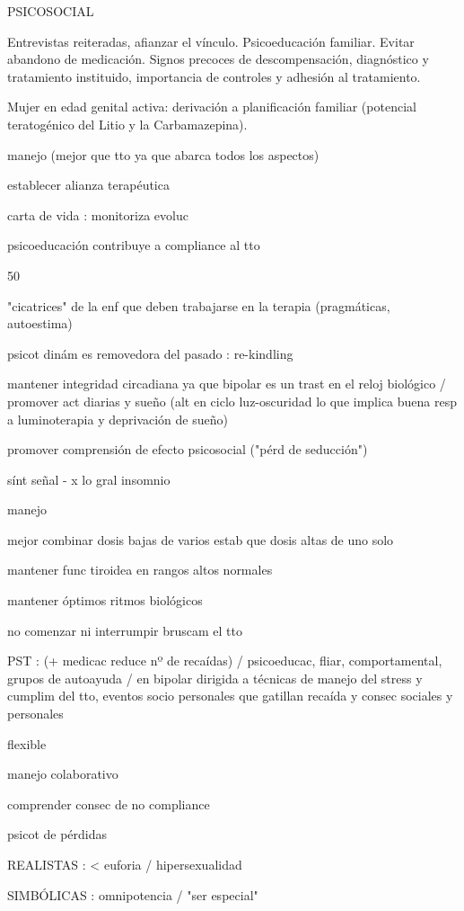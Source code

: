 PSICOSOCIAL

Entrevistas reiteradas, afianzar el vínculo. Psicoeducación familiar. Evitar abandono de medicación. Signos precoces de descompensación, diagnóstico y tratamiento instituido, importancia de controles y adhesión al tratamiento.

Mujer en edad genital activa: derivación a planificación familiar (potencial teratogénico del Litio y la Carbamazepina).

manejo (mejor que tto ya que abarca todos los aspectos)

establecer alianza terapéutica

carta de vida : monitoriza evoluc

psicoeducación contribuye a compliance al tto

50 %

"cicatrices" de la enf que deben trabajarse en la terapia (pragmáticas, autoestima)

psicot dinám es removedora del pasado : re-kindling

mantener integridad circadiana ya que bipolar es un trast en el reloj biológico / promover act diarias y sueño (alt en ciclo luz-oscuridad lo que implica buena resp a luminoterapia y deprivación de sueño)

promover comprensión de efecto psicosocial ("pérd de seducción")

sínt señal - x lo gral insomnio

manejo

mejor combinar dosis bajas de varios estab que dosis altas de uno solo

mantener func tiroidea en rangos altos normales

mantener óptimos ritmos biológicos

no comenzar ni interrumpir bruscam el tto

PST : (+ medicac reduce nº de recaídas) / psicoeducac, fliar, comportamental, grupos de autoayuda / en bipolar dirigida a técnicas de manejo del stress y cumplim del tto, eventos socio personales que gatillan recaída y consec sociales y personales

flexible

manejo colaborativo

comprender consec de no compliance

psicot de pérdidas

REALISTAS : < euforia / hipersexualidad

SIMBÓLICAS : omnipotencia / "ser especial"

